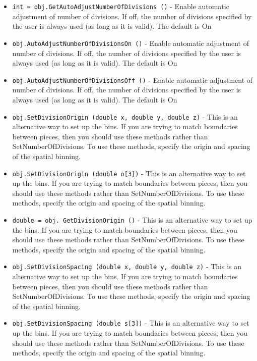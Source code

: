 \begin{itemize}
\item  \verb|int = obj.GetAutoAdjustNumberOfDivisions ()| -  Enable automatic adjustment of number of divisions. If off, the number
 of divisions specified by the user is always used (as long as it is valid).
 The default is On

\item  \verb|obj.AutoAdjustNumberOfDivisionsOn ()| -  Enable automatic adjustment of number of divisions. If off, the number
 of divisions specified by the user is always used (as long as it is valid).
 The default is On

\item  \verb|obj.AutoAdjustNumberOfDivisionsOff ()| -  Enable automatic adjustment of number of divisions. If off, the number
 of divisions specified by the user is always used (as long as it is valid).
 The default is On

\item  \verb|obj.SetDivisionOrigin (double x, double y, double z)| -  This is an alternative way to set up the bins.  If you are trying to match
 boundaries between pieces, then you should use these methods rather than
 SetNumberOfDivisions. To use these methods, specify the origin and spacing
 of the spatial binning.

\item  \verb|obj.SetDivisionOrigin (double o[3])| -  This is an alternative way to set up the bins.  If you are trying to match
 boundaries between pieces, then you should use these methods rather than
 SetNumberOfDivisions. To use these methods, specify the origin and spacing
 of the spatial binning.

\item  \verb|double = obj. GetDivisionOrigin ()| -  This is an alternative way to set up the bins.  If you are trying to match
 boundaries between pieces, then you should use these methods rather than
 SetNumberOfDivisions. To use these methods, specify the origin and spacing
 of the spatial binning.

\item  \verb|obj.SetDivisionSpacing (double x, double y, double z)| -  This is an alternative way to set up the bins.  If you are trying to match
 boundaries between pieces, then you should use these methods rather than
 SetNumberOfDivisions. To use these methods, specify the origin and spacing
 of the spatial binning.

\item  \verb|obj.SetDivisionSpacing (double s[3])| -  This is an alternative way to set up the bins.  If you are trying to match
 boundaries between pieces, then you should use these methods rather than
 SetNumberOfDivisions. To use these methods, specify the origin and spacing
 of the spatial binning.


\end{itemize}
